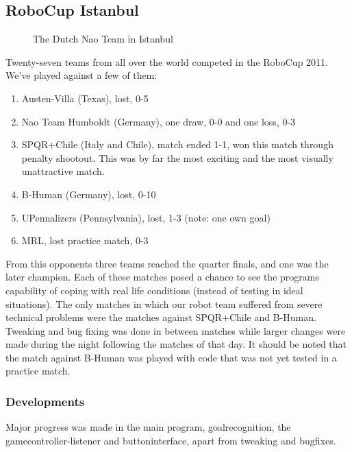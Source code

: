 \documentclass[11pt,a4paper,oneside]{article}
\begin{document}
\subsection{RoboCup Istanbul}
\begin{figure}[htb]    	
\centering
{}
\caption{The Dutch Nao Team in Istanbul}
\label{fig:TeamPhotoIstanbul}
\end{figure}

Twenty-seven teams from all over the world competed in the RoboCup 2011. We've played against a few of them:
\begin{enumerate}
\item Austen-Villa (Texas), lost, 0-5
\item Nao Team Humboldt (Germany), one draw, 0-0 and one loss, 0-3
\item SPQR+Chile (Italy and Chile), match ended 1-1, won this match through penalty shootout. This was by far the most exciting and the most visually unattractive match.
\item B-Human (Germany), lost, 0-10
\item UPennalizers (Pennsylvania), lost, 1-3 (note: one own goal)
\item MRL, lost practice match, 0-3
\end{enumerate}
From this opponents three teams reached the quarter finals, and one was the later champion.
Each of these matches posed a chance to see the programs capability of coping with real life conditions (instead of testing in ideal situations). The only matches in which our robot team suffered from severe technical problems were the matches against SPQR+Chile and B-Human. Tweaking and bug fixing was done in between matches while larger changes were made during the night following the matches of that day. It should be noted that the match against B-Human was played with code that was not yet tested in a practice match.

\subsubsection{Developments}
Major progress was made in the main program, goalrecognition, the gamecontroller-listener and buttoninterface, apart from tweaking and bugfixes.
\end{document}
